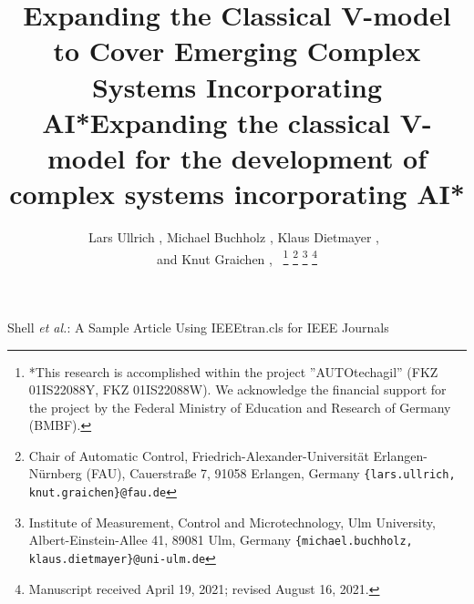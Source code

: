 
\title{Expanding the Classical V-model to Cover Emerging Complex Systems Incorporating AI*}


\title{Expanding the classical V-model for the development of complex systems incorporating AI*}





\author{Lars Ullrich  , Michael Buchholz  , Klaus Dietmayer  ,~ \\and Knut Graichen  ,~
	\thanks{*This research is accomplished within the project ”AUTOtechagil” (FKZ 01IS22088Y, FKZ 01IS22088W). We acknowledge the financial support for the project by the Federal Ministry of Education and Research of Germany (BMBF).}%
	\thanks{Chair of Automatic Control, Friedrich-Alexander-Universität Erlangen-Nürnberg (FAU), Cauerstraße 7, 91058 Erlangen, Germany {\tt\footnotesize \{lars.ullrich, knut.graichen\}@fau.de}}
	\thanks{Institute of Measurement, Control and Microtechnology, Ulm University, Albert-Einstein-Allee 41, 89081 Ulm, Germany {\tt\footnotesize \{michael.buchholz, klaus.dietmayer\}@uni-ulm.de}}
	\thanks{Manuscript received April 19, 2021; revised August 16, 2021.}}

%
{Shell \MakeLowercase{\textit{et al.}}: A Sample Article Using IEEEtran.cls for IEEE Journals}
